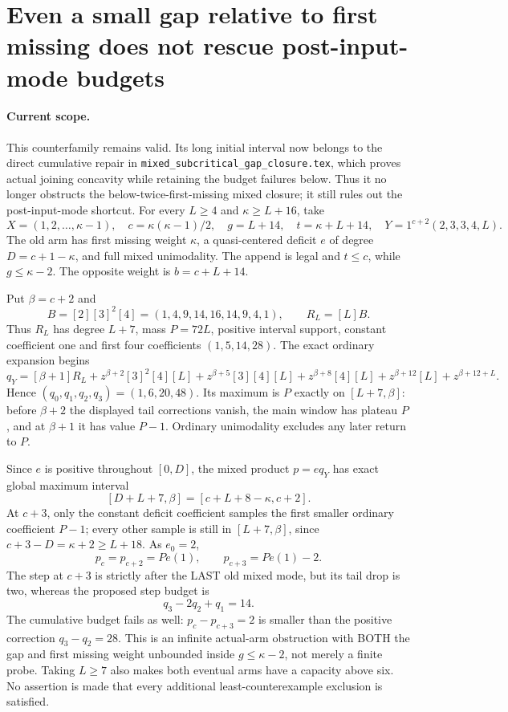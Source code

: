 \section{Even a small gap relative to first missing does not rescue post-input-mode budgets}
\paragraph{Current scope.}
This counterfamily remains valid. Its long initial interval
now belongs to the direct cumulative repair in
\texttt{mixed\_subcritical\_gap\_closure.tex}, which proves
actual joining concavity while retaining the budget failures
below. Thus it no longer obstructs the below-twice-first-missing
mixed closure; it still rules out the post-input-mode shortcut.
For every $L\ge4$ and $\kappa\ge L+16$, take
\[
 X=(1,2,\ldots,\kappa-1),\quad c=\kappa(\kappa-1)/2,
 \quad g=L+14,\quad t=\kappa+L+14,\quad
 Y=1^{c+2}(2,3,3,4,L).
\]
The old arm has first missing weight $\kappa$, a quasi-centered
deficit $e$ of degree $D=c+1-\kappa$, and full mixed
unimodality. The append is legal and $t\le c$, while
$g\le\kappa-2$. The opposite weight is $b=c+L+14$.

Put $\beta=c+2$ and
\[
 B=[2][3]^2[4]=(1,4,9,14,16,14,9,4,1),\qquad R_L=[L]B.
\]
Thus $R_L$ has degree $L+7$, mass $P=72L$, positive
interval support, constant coefficient one and first
four coefficients $(1,5,14,28)$.
The exact ordinary expansion begins
\[
 q_Y=[\beta+1]R_L+z^{\beta+2}[3]^2[4][L]
 +z^{\beta+5}[3][4][L]+z^{\beta+8}[4][L]
 +z^{\beta+12}[L]+z^{\beta+12+L}.
\]
Hence $(q_0,q_1,q_2,q_3)=(1,6,20,48)$.
Its maximum is $P$ exactly on $[L+7,\beta]$:
before $\beta+2$ the displayed tail corrections vanish,
the main window has plateau $P$, and at $\beta+1$
it has value $P-1$. Ordinary unimodality excludes any
later return to $P$.

Since $e$ is positive throughout $[0,D]$, the mixed
product $p=e q_Y$ has exact global maximum interval
\[
                   [D+L+7,\beta]=[c+L+8-\kappa,c+2].
\]
At $c+3$, only the constant deficit coefficient samples
the first smaller ordinary coefficient $P-1$; every other
sample is still in $[L+7,\beta]$, since
$c+3-D=\kappa+2\ge L+18$. As $e_0=2$,
\[
               p_c=p_{c+2}=Pe(1),\qquad
               p_{c+3}=Pe(1)-2.
\]
The step at $c+3$ is strictly after the LAST old mixed
mode, but its tail drop is two, whereas the proposed
step budget is
\[
              q_3-2q_2+q_1=14.
\]
The cumulative budget fails as well: $p_c-p_{c+3}=2$
is smaller than the positive correction $q_3-q_2=28$.
This is an infinite actual-arm obstruction with BOTH
the gap and first missing weight unbounded inside
$g\le\kappa-2$, not merely a finite probe. Taking
$L\ge7$ also makes both eventual arms have a capacity
above six. No assertion is made that every additional
least-counterexample exclusion is satisfied.

